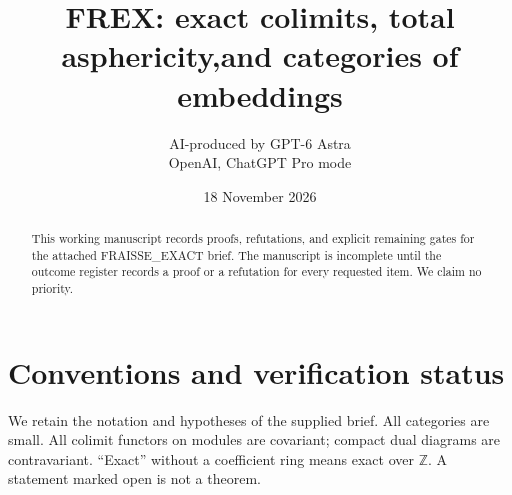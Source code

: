 \documentclass[11pt,a4paper]{article}
\title{FREX: exact colimits, total asphericity,\newline and categories of embeddings}
\author{AI-produced by GPT-6 Astra\\OpenAI, ChatGPT Pro mode}
\date{18 November 2026}
\theoremstyle{definition}
\newcommand{\Z}{\mathbb Z}\newcommand{\Q}{\mathbb Q}\newcommand{\R}{\mathbb R}\newcommand{\F}{\mathbb F}\newcommand{\N}{\mathbb N}
\begin{document}
\maketitle
\begin{abstract}
This working manuscript records proofs, refutations, and explicit remaining gates for the attached FRAISSE\_EXACT brief. The manuscript is incomplete until the outcome register records a proof or a refutation for every requested item. We claim no priority.
\end{abstract}
\tableofcontents
\clearpage
\section*{Conventions and verification status}
We retain the notation and hypotheses of the supplied brief. All categories are small. All colimit functors on modules are covariant; compact dual diagrams are contravariant. ``Exact'' without a coefficient ring means exact over $\Z$. A statement marked open is not a theorem.

\begingroup
\setlength{\bibsep}{4pt}


\endgroup
\end{document}
